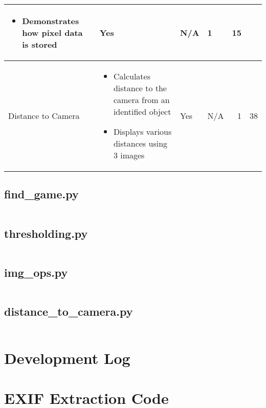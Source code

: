 \begin{landscape}
\begin{table}[h!]
\begin{tabular}{|l|p{}|l|p{}|r|r|}
\begin{itemize}[noitemsep,topsep=0pt,parsep=0pt]
						\item{Demonstrates how pixel data is stored}
					\end{itemize}&
					Yes&
					N/A&
					1&
					15\\
					\hline
					Distance to Camera&
					\begin{itemize}[noitemsep,topsep=0pt,parsep=0pt]
						\item{Calculates distance to the camera from an identified object}
						\item{Displays various distances using 3 images}
					\end{itemize}&
					Yes&
					N/A&
					1&
					38\\
					\hline
				\end{tabular}
			\end{table}
		\end{landscape}
		\restoregeometry
		\subsection{find\_game.py}
		\inputminted[breaklines,
						linenos,
						frame=lines,
						fontsize=\footnotesize]{python}{../code/python/find_game.py}
		\subsection{thresholding.py}
		\inputminted[breaklines,
						linenos,
						frame=lines,
						fontsize=\footnotesize]{python}{../code/python/thresholding.py}
		\subsection{img\_ops.py}
		\inputminted[breaklines,
						linenos,
						frame=lines,
						fontsize=\footnotesize]{python}{../code/python/img_ops.py}
		\subsection{distance\_to\_camera.py}
		\inputminted[breaklines,
						linenos,
						frame=lines,
						fontsize=\footnotesize]{python}{../code/python/distance_to_camera.py}
\clearpage
\section{Development Log}\label{app:dev_log}

\section{EXIF Extraction Code}\label{app:exif_code}
	\inputminted[breaklines,
				linenos,
				frame=lines,
				fontsize=\footnotesize,
				firstline=36,
				lastline=63]{python}{../code/program/v2.py}

